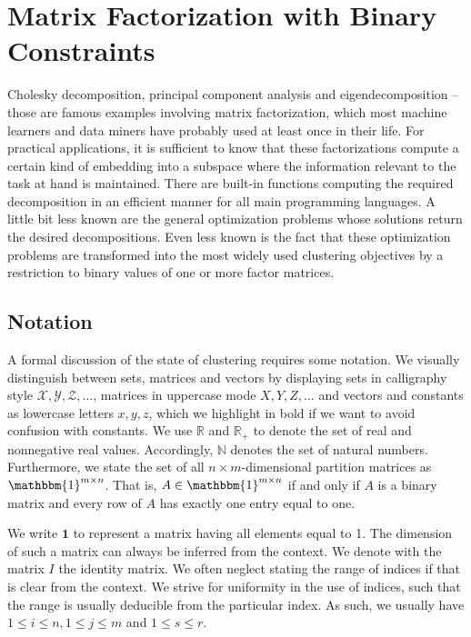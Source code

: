 \chapter{Matrix Factorization with Binary Constraints}
\label{chap:ZeroShades}
Cholesky decomposition, principal component analysis and eigendecomposition -- those are famous examples involving matrix factorization, which most machine learners and data miners have probably used at least once in their life. For practical applications, it is sufficient to know that these factorizations compute a certain kind of embedding into a subspace where the information relevant to the task at hand is maintained. There are built-in functions computing the required decomposition in an efficient manner for all main programming languages. A little bit less known are the general optimization problems whose solutions return the desired decompositions. Even less known is the fact that these optimization problems are transformed into the most widely used clustering objectives by a restriction to binary values of one or more factor matrices. 
\section{Notation}
A formal discussion of the state of clustering requires some notation. We visually distinguish between sets, matrices and vectors by displaying sets in calligraphy style $\mathcal{X},\mathcal{Y},\mathcal{Z},\ldots$, matrices in uppercase mode $X,Y,Z,\ldots$ and vectors and constants as lowercase letters $x,y,z$, which we highlight in bold if we want to avoid confusion with constants. We use $\mathbb{R}$ and $\mathbb{R}_+$ to denote the set of real and nonnegative real values. Accordingly, $\mathbb{N}$ denotes the set of natural numbers. Furthermore, we state the set of all $n\times m$-dimensional partition matrices as $\mathbbm{1}^{m\times n}$. That is, $A\in\mathbbm{1}^{m\times n}$ if and only if $A$ is a binary matrix and every row of $A$ has exactly one entry equal to one. 

We write $\mathbf{1}$ to represent a matrix having all elements equal to 1. The dimension of such a matrix can always be inferred from the context. We denote with the matrix $I$ the identity matrix.
We often neglect stating the range of indices if that is clear from the context. We strive for uniformity in the use of indices, such that the range is usually deducible from the particular index. As such, we usually have $1\leq i\leq n, 1\leq j\leq m$ and $1\leq s\leq r$.

